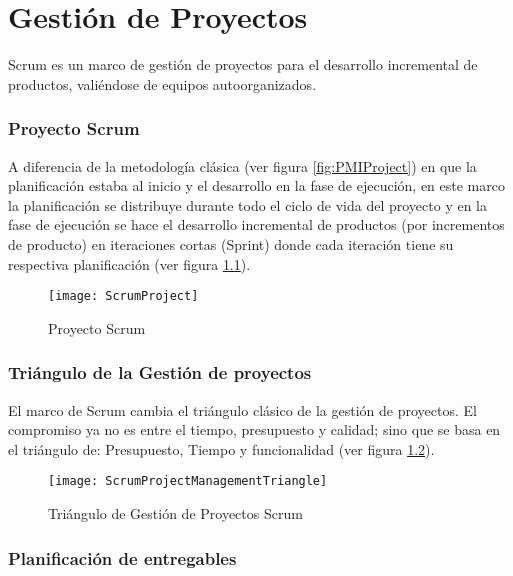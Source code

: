 \chapter{Gestión de Proyectos}

Scrum es un marco de gestión de proyectos para el desarrollo incremental de productos, valiéndose de equipos autoorganizados. 



\subsection{Proyecto Scrum}
A diferencia de la metodología clásica (ver figura \ref{fig:PMIProject}) en que la planificación estaba al inicio y el desarrollo en la fase de ejecución, en este marco la planificación se distribuye durante todo el ciclo de vida del proyecto y en la fase de ejecución se hace el desarrollo incremental de productos (por incrementos de producto) en iteraciones cortas (Sprint) donde cada iteración tiene su respectiva planificación (ver figura \ref{fig:ScrumProject}).

\begin{figure}[h]
  \centering
  \texttt{[image: ScrumProject]}
  \caption{Proyecto Scrum}
  \centering
  \label{fig:ScrumProject} %
\end{figure}

\subsection{Triángulo de la Gestión de proyectos}

El marco de Scrum cambia el triángulo clásico de la gestión de proyectos. El compromiso ya no es entre el tiempo, presupuesto y calidad; sino que se basa en el triángulo de: Presupuesto, Tiempo y funcionalidad (ver figura \ref{fig:ScrumProjectManagementTriangle}).

\begin{figure}[h]
  \centering
  \texttt{[image: ScrumProjectManagementTriangle]}
  \caption{Triángulo de Gestión de Proyectos Scrum}
  \centering
  \label{fig:ScrumProjectManagementTriangle} %
\end{figure}

\subsection{Planificación de entregables}

